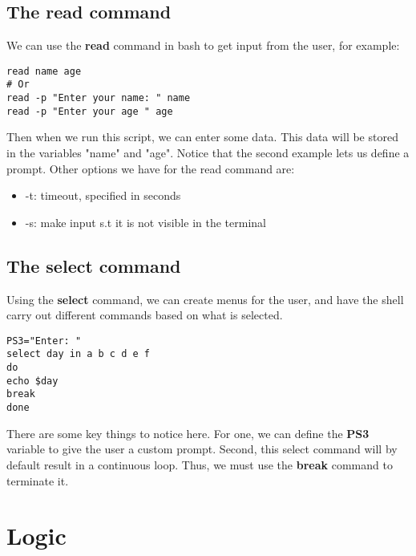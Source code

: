 \documentclass{report}
\begin{document}
  \pagebreak \bigbreak \noindent 
  \subsection{The read command}
  \bigbreak \noindent 
  We can use the \textbf{read} command in bash to get input from the user, for example:
  \begin{mdframed}[style=purplebox]
  \begin{verbatim}
read name age
# Or
read -p "Enter your name: " name
read -p "Enter your age " age
  \end{verbatim}
  \bigbreak \noindent
  \end{mdframed}
  \bigbreak \noindent 
  Then when we run this script, we can enter some data. This data will be stored in the variables "name" and "age". Notice that the second example lets us define a prompt.
  \bigbreak \noindent 
  Other options we have for the read command are:
    \begin{itemize}
        \item -t: timeout, specified in seconds
        \item -s: make input s.t it is not visible in the terminal 
    \end{itemize}

    \bigbreak \noindent 
    \subsection{The select command}
    \bigbreak \noindent 
    Using the \textbf{select} command, we can create menus for the user, and have the shell carry out different commands based on what is selected. 
    \begin{mdframed}[style=purplebox]
    \begin{verbatim}
PS3="Enter: "
select day in a b c d e f 
do 
echo $day
break
done
    \end{verbatim}
    \bigbreak \noindent
    \end{mdframed}
    \bigbreak \noindent 
    There are some key things to notice here. For one, we can define the \textbf{PS3} variable to give the user a custom prompt. Second, this select command will by default result in a continuous loop. Thus, we must use the \textbf{break} command to terminate it.

    \pagebreak \bigbreak \noindent 
    \section{\LARGE Logic}
    \bigbreak \noindent 
\end{document}

